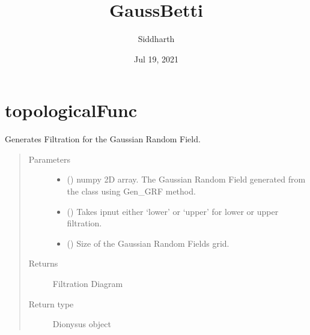 \documentclass[letterpaper,10pt,english]{sphinxmanual}
\title{GaussBetti}
\date{Jul 19, 2021}
\author{Siddharth}
\begin{document}
\pagestyle{empty}
\sphinxmaketitle
\pagestyle{plain}
\sphinxtableofcontents
\pagestyle{normal}
\label{\detokenize{index::doc}}



\chapter{topologicalFunc}
\label{\detokenize{topologicalFunc:topologicalfunc}}\label{\detokenize{topologicalFunc:id1}}\label{\detokenize{topologicalFunc::doc}}\label{\detokenize{topologicalFunc:module-topologicalFunc}}

\begin{fulllineitems}
\label{\detokenize{topologicalFunc:topologicalFunc.GaussianFiltration}}
\sphinxAtStartPar
Generates Filtration for the Gaussian Random Field.
\begin{quote}\begin{description}
\item[{Parameters}] \leavevmode\begin{itemize}
\item {} 
\sphinxAtStartPar
{} () \textendash{} numpy 2\sphinxhyphen{}D array. The Gaussian Random Field generated from the class using Gen\_GRF method.

\item {} 
\sphinxAtStartPar
{} () \textendash{} Takes ipnut either ‘lower’ or ‘upper’ for lower or upper filtration.

\item {} 
\sphinxAtStartPar
{} () \textendash{} Size of the Gaussian Random Fields grid.

\end{itemize}

\item[{Returns}] \leavevmode
\sphinxAtStartPar
Filtration Diagram

\item[{Return type}] \leavevmode
\sphinxAtStartPar
Dionysus object

\end{description}\end{quote}

\end{fulllineitems}
\end{document}
